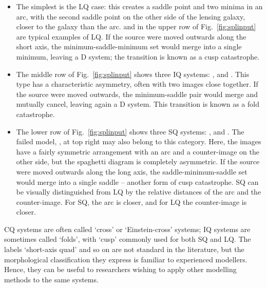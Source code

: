 \begin{itemize}
\item The simplest is the LQ case: this creates a saddle point and two
  minima in an arc, with the second saddle point on the other side of
  the lensing galaxy, closer to the galaxy than the arc.  
  and  in the upper row of Fig.~\ref{fig:splinput} are typical
  examples of LQ.  If the source were moved outwards along the short
  axis, the minimum-saddle-minimum set would merge into a single minimum,
  leaving a D system; the transition is known as a cusp catastrophe.
\item The middle row of Fig.~\ref{fig:splinput} shows three IQ
  systems: ,  and .  This type has a characteristic
  asymmetry, often with two images close together.  If the source
  were moved outwards, the minimum-saddle pair would merge and
  mutually cancel, leaving again a D system. This transition is known
  as a fold catastrophe.
\item The lower row of Fig.~\ref{fig:splinput} shows three SQ
  systems: ,  and . The failed model, , at top right
  may also belong to this category.  Here, the images have a
  fairly symmetric arrangement with an arc and a counter-image on the
  other side, but the spaghetti diagram is completely asymmetric.  If
  the source were moved outwards along the long axis, the
  saddle-minimum-saddle set  would merge into a single saddle -- another
  form of cusp catastrophe.  SQ can be visually distinguished from LQ
  by the relative distances of the arc and the counter-image.  For
  SQ, the arc is closer, and for LQ the counter-image is closer.
\end{itemize}
CQ systems are often called `cross' or `Einstein-cross' systems; IQ
systems are sometimes called `folds', with `cusp' commonly used for
both SQ and LQ.  The labels `short-axis quad' and so on are not
standard in the literature, but the morphological classification they
express is familiar to experienced modellers.  Hence, they can be
useful to researchers wishing to apply other modelling methods to the
same systems.

